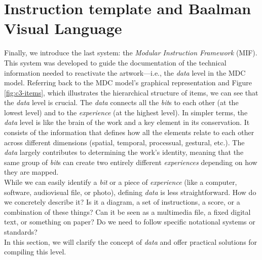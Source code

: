 \section{Instruction template and Baalman Visual Language}
Finally, we introduce the last system: the \textit{Modular Instruction Framework} (MIF). This system was developed to guide the documentation of the technical information needed to reactivate the artwork—i.e., the \textit{data} level in the MDC model. Referring back to the MDC model’s graphical representation and Figure \ref{fig:c3-items}, which illustrates the hierarchical structure of items, we can see that the \textit{data} level is crucial. The \textit{data} connects all the \textit{bit}s to each other (at the lowest level) and to the \textit{experience} (at the highest level). In simpler terms, the \textit{data} level is like the brain of the work and a key element in its conservation. It consists of the information that defines how all the elements relate to each other across different dimensions (spatial, temporal, processual, gestural, etc.). The \textit{data} largely contributes to determining the work’s identity, meaning that the same group of \textit{bit}s can create two entirely different \textit{experiences} depending on how they are mapped.\\
While we can easily identify a \textit{bit} or a piece of \textit{experience} (like a computer, software, audiovisual file, or photo), defining \textit{data} is less straightforward. How do we concretely describe it? Is it a diagram, a set of instructions, a score, or a combination of these things? Can it be seen as a multimedia file, a fixed digital text, or something on paper? Do we need to follow specific notational systems or standards?\\
In this section, we will clarify the concept of \textit{data} and offer practical solutions for compiling this level.\\
